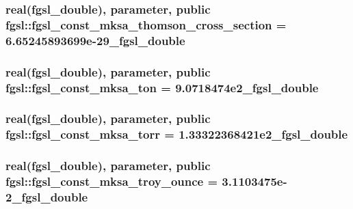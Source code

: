 \hypertarget{classfgsl_a6db1579c2961f86ba36e1ec23eea34cf}{
\subsubsection[{fgsl\-\_\-const\-\_\-mksa\-\_\-thomson\-\_\-cross\-\_\-section}]{\setlength{\rightskip}{0pt plus 5cm}real({\bf fgsl\-\_\-double}), parameter, public fgsl\-::fgsl\-\_\-const\-\_\-mksa\-\_\-thomson\-\_\-cross\-\_\-section = 6.\-65245893699e-\/29\-\_\-fgsl\-\_\-double}}\label{classfgsl_a6db1579c2961f86ba36e1ec23eea34cf}
\hypertarget{classfgsl_a28b9223526d6d5565fda3d778045fee0}{
\subsubsection[{fgsl\-\_\-const\-\_\-mksa\-\_\-ton}]{\setlength{\rightskip}{0pt plus 5cm}real({\bf fgsl\-\_\-double}), parameter, public fgsl\-::fgsl\-\_\-const\-\_\-mksa\-\_\-ton = 9.\-0718474e2\-\_\-fgsl\-\_\-double}}\label{classfgsl_a28b9223526d6d5565fda3d778045fee0}
\hypertarget{classfgsl_aba0c7c1da846e36ceea84cec02bb6478}{
\subsubsection[{fgsl\-\_\-const\-\_\-mksa\-\_\-torr}]{\setlength{\rightskip}{0pt plus 5cm}real({\bf fgsl\-\_\-double}), parameter, public fgsl\-::fgsl\-\_\-const\-\_\-mksa\-\_\-torr = 1.\-33322368421e2\-\_\-fgsl\-\_\-double}}\label{classfgsl_aba0c7c1da846e36ceea84cec02bb6478}
\hypertarget{classfgsl_a7046241db07bad6371b685e812c9d177}{
\subsubsection[{fgsl\-\_\-const\-\_\-mksa\-\_\-troy\-\_\-ounce}]{\setlength{\rightskip}{0pt plus 5cm}real({\bf fgsl\-\_\-double}), parameter, public fgsl\-::fgsl\-\_\-const\-\_\-mksa\-\_\-troy\-\_\-ounce = 3.\-1103475e-\/2\-\_\-fgsl\-\_\-double}}\label{classfgsl_a7046241db07bad6371b685e812c9d177}
